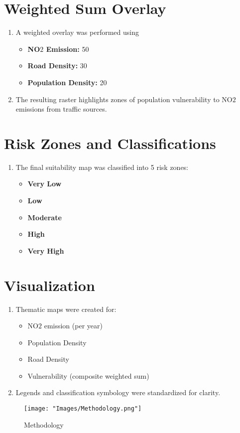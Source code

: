 \documentclass[12pt]{report}
\begin{document}
\section{Weighted Sum Overlay}
\begin{enumerate}
    \item A weighted overlay was performed using
    \begin{itemize}
        \item \textbf{NO$2$ Emission:} 50%
        \item \textbf{Road Density:} 30%
        \item \textbf{Population Density:} 20%
    \end{itemize}
    \item The resulting raster highlights zones of population vulnerability to NO$2$ emissions from traffic sources.
\end{enumerate}
\section{Risk Zones and Classifications}
\begin{enumerate}
    \item The final suitability map was classified into 5 risk zones:
    \begin{itemize}
        \item \textbf{Very Low}
        \item \textbf{Low}
        \item \textbf{Moderate}
        \item \textbf{High}
        \item \textbf{Very High}
    \end{itemize}
\end{enumerate}
\section{Visualization}
\begin{enumerate}
    \item Thematic maps were created for:
    \begin{itemize}
        \item NO$2$ emission (per year)
        \item Population Density
        \item Road Density
        \item Vulnerability (composite weighted sum)
    \end{itemize}
    \item Legends and classification symbology were standardized for clarity.
\end{enumerate}
\begin{figure}[H]
    \centering
    \texttt{[image: "Images/Methodology.png"]}
    \caption{Methodology}
    \label{fig:enter-label}
\end{figure}
\end{document}
